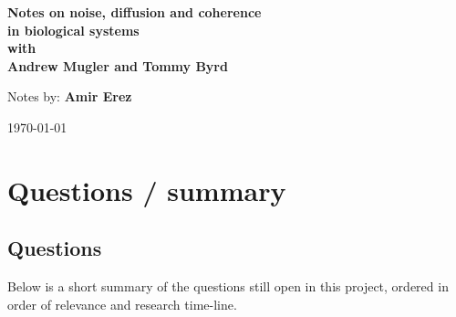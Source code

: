 \documentclass[onecolumn,fleqn,12pt,openany]{book}
\begin{document}
\def\be{\begin{equation}}
\def\ee{\end{equation}}
\def\bea{\begin{eqnarray}}
\def\eea{\end{eqnarray}}
\def\nl{\\ \noindent}
\def\nn{\\ \nonumber}


\newcommand{\Cn}[1]{\begin{center} #1 \end{center}}

\begin{titlepage}


\Cn{\LARGE \bf Notes on noise, diffusion and coherence\\
in biological systems\\ 
with\\
 Andrew Mugler and Tommy Byrd}



\bigskip
\bigskip


\bigskip
\bigskip
\bigskip
\bigskip
\bigskip
\bigskip
\Cn{
Notes by: {\bf Amir Erez}

\bigskip

}

\bigskip
\bigskip

\bigskip
\bigskip

\Cn{\today}


\end{titlepage}


\newpage



\newpage

{\footnotesize \tableofcontents}
\newpage


\chapter{Questions / summary}
\section{Questions}
Below is a short summary of the questions still open in this project, ordered in order of relevance and research time-line.
\end{document}
